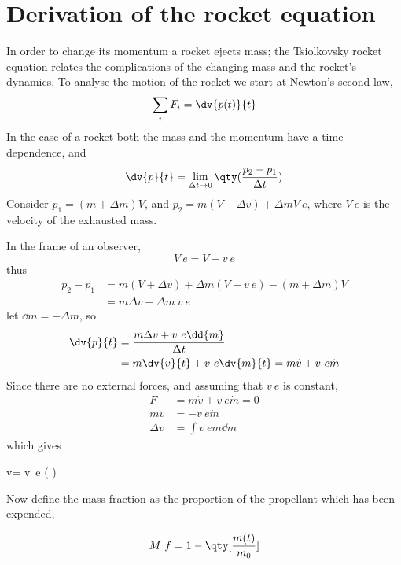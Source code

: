 
\section{Derivation of the rocket equation}
\label{sec:deriv-rock-equat}

In order to change its momentum a rocket ejects mass; the Tsiolkovsky
rocket equation relates the complications of the changing mass and the
rocket's dynamics.  To analyse the motion of the rocket we start at
Newton's second law,
\begin{equation}
  \label{eq:10}
  \sum_i F_i = \dv{p(t)}{t}
\end{equation}
In the case of a rocket both the mass and the momentum have a time
dependence, and
\begin{equation}
  \label{eq:11}
  \dv{p}{t} = \lim_{\Delta t \to 0} \qty( \frac{p_2 - p_1}{\Delta t} )
\end{equation}
Consider $p_1 = (m + \Delta m) V$, and $p_2 = m(V + \Delta v) + \Delta
m V~e$, where $V~e$ is the velocity of the exhausted mass.

In the frame of an observer,
\[ V~e = V - v~e \]
thus 
\begin{align*}
  p_2 - p_1 &= m(V + \Delta v) + \Delta m (V-v~e) - (m+\Delta m) V \\
&= m \Delta v - \Delta m \ v~e
\end{align*}
let $\dd{m} = -\Delta m$, so
\begin{align*}
  \dv{p}{t} &= \frac{m \Delta v + v~e \dd{m}}{\Delta t} \\
&= m \dv{v}{t} + v~e \dv{m}{t} = m \dot{v} + v~e \dot{m}
\end{align*}
Since there are no external forces, and assuming that $v~e$ is
constant,
\begin{align*}
  F &= m \dot{v} + v~e \dot{m} = 0 \\
m \dot{v} &= - v~e \dot{m} \\
\Delta v &= \int v~e m \dd{m} 
\end{align*}
which gives
\begin{fequation}
  \label{eq:13}
\label{eq:rocket-equation}
  \Delta v= v~e \log(  )
\end{fequation}
Now define the mass fraction as the proportion of the propellant which
has been expended,
\begin{definition}
  \label{def:mass-fraction}
  \[ M~f = 1 - \qty[ \frac{m(t)}{m_0}] \]
\end{definition}


